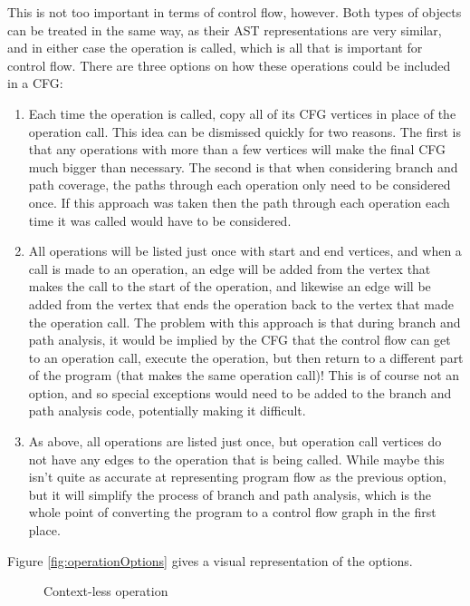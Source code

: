 This is not too important in terms of control flow, however. Both types of objects can be treated in the same way, as their AST representations are very similar, and in either case the operation is called, which is all that is important for control flow. There are three options on how these operations could be included in a CFG:

\begin{enumerate}
\item Each time the operation is called, copy all of its CFG vertices in place of the operation call. This idea can be dismissed quickly for two reasons. The first is that any operations with more than a few vertices will make the final CFG much bigger than necessary. The second is that when considering branch and path coverage, the paths through each operation only need to be considered once. If this approach was taken then the path through each operation each time it was called would have to be considered.
\item All operations will be listed just once with start and end vertices, and when a call is made to an operation, an edge will be added from the vertex that makes the call to the start of the operation, and likewise an edge will be added from the vertex that ends the operation back to the vertex that made the operation call. The problem with this approach is that during branch and path analysis, it would be implied by the CFG that the control flow can get to an operation call, execute the operation, but then return to a different part of the program (that makes the same operation call)! This is of course not an option, and so special exceptions would need to be added to the branch and path analysis code, potentially making it difficult.
\item As above, all operations are listed just once, but operation call vertices do not have any edges to the operation that is being called. While maybe this isn't quite as accurate at representing program flow as the previous option, but it will simplify the process of branch and path analysis, which is the whole point of converting the program to a control flow graph in the first place.
\end{enumerate}

Figure \ref{fig:operationOptions} gives a visual representation of the options.

\begin{figure}

\caption{Context-less operation}
\label{lst:contextlessOp}
\end{figure}

